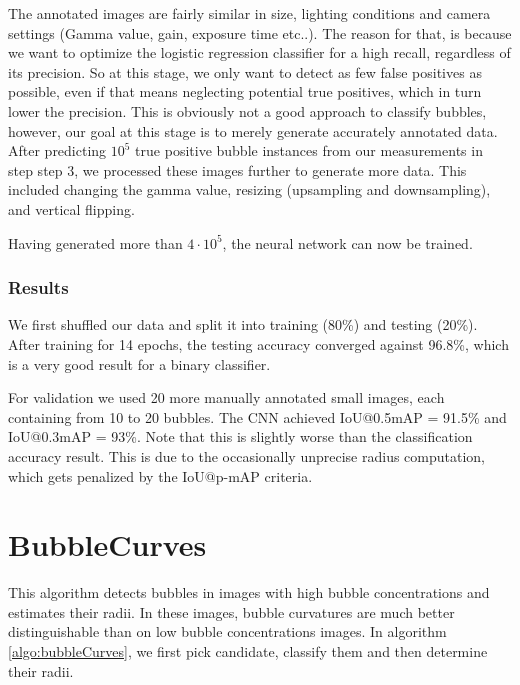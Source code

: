 			The annotated images are fairly similar in size, lighting conditions and camera settings (Gamma value, gain, exposure time etc..). The reason for that, is because we want to optimize the logistic regression classifier for a high recall, regardless of its precision. So at this stage, we only want to detect as few false positives as possible, even if that means neglecting potential true positives, which in turn lower the precision. This is obviously not a good approach to classify bubbles, however, our goal at this stage is to merely generate accurately annotated data. After predicting $10^5$ true positive bubble instances from our measurements in step step 3, we processed these images further to generate more data. This included changing the gamma value, resizing (upsampling and downsampling), and vertical flipping. 
			
			Having generated more than $4 \cdot 10^5$, the neural network can now be trained. 
			
			
			
			


			
		\subsubsection{Results}
			
			We first shuffled our data and split it into training (80\%) and testing (20\%). After training for 14 epochs, the testing accuracy converged against 96.8\%, which is a very good result for a binary classifier. 
			
			For validation we used 20 more manually annotated small images, each containing from 10 to 20 bubbles. The CNN achieved IoU@0.5mAP = 91.5\% and IoU@0.3mAP = 93\%. Note that this is slightly worse than the classification accuracy result. This is due to the occasionally unprecise radius computation, which gets penalized by the IoU@p-mAP criteria. 
	
	
	
	
	
	
	
	\section{BubbleCurves}\label{BubbleCurves}
		This algorithm detects bubbles in images with high bubble concentrations and estimates their radii. In these images, bubble curvatures are much better distinguishable than on low bubble concentrations images. In algorithm \ref{algo:bubbleCurves}, we first pick candidate, classify them and then determine their radii.
	
